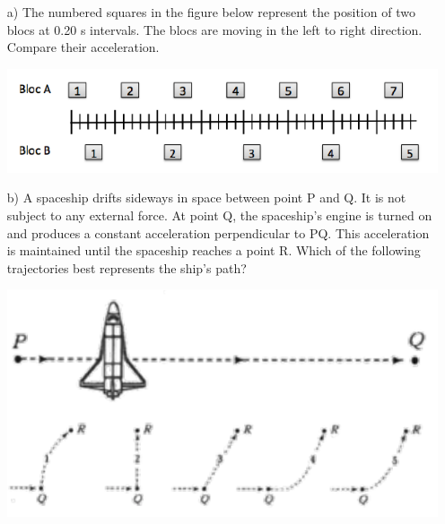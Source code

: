 %
%

\begin{center}
\vspace*{5mm}
\end{center}

\begin{enumerate}
\item[a)] The numbered squares in the figure below represent the position of two blocs at 0.20 s intervals. The blocs are moving in the left to right direction. Compare their acceleration.
\begin{center}
\includegraphics{figures/serie01_concept1.pdf}
\end{center}

\item[b)] A spaceship drifts sideways in space between point P and Q. It is not subject to any external force. At point Q, the spaceship's engine is turned on and produces a constant acceleration perpendicular to PQ. This acceleration is maintained until the spaceship reaches a point R. Which of the following trajectories best represents the ship's path?

\begin{center}
\includegraphics{figures/serie01_concept2.pdf}
\end{center}
\end{enumerate}

